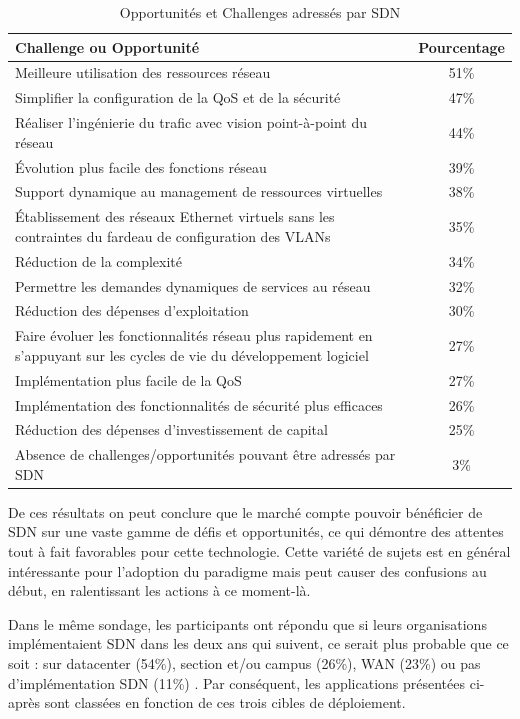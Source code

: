\begin{table}[!h]
\centering
\begin{tabular}{|p{12cm}|c|}
\hline 
\bf Challenge ou Opportunité & \bf Pourcentage \\ 
\hline 
Meilleure utilisation des ressources réseau & 51\% \\ 
\hline 
Simplifier la configuration de la QoS et de la sécurité  & 47\%  \\
\hline 
Réaliser l'ingénierie du trafic avec vision point-à-point du réseau & 44\% \\ 
\hline 
Évolution plus facile des fonctions réseau & 39\% \\ 
\hline 
Support dynamique au management de ressources virtuelles  & 38\% \\ 
\hline 
Établissement des réseaux Ethernet virtuels sans les contraintes du fardeau de configuration des VLANs & 35\% \\ 
\hline 
Réduction de la complexité & 34\% \\ 
\hline 
Permettre les demandes dynamiques de services au réseau & 32\% \\ 
\hline 
Réduction des dépenses d'exploitation & 30\% \\ 
\hline 
Faire évoluer les fonctionnalités réseau plus rapidement en s'appuyant sur les cycles de vie du développement logiciel & 27\% \\ 
\hline 
Implémentation plus facile de la QoS & 27\% \\ 
\hline 
Implémentation des fonctionnalités de sécurité plus efficaces & 26\% \\ 
\hline 
Réduction des dépenses d'investissement de capital & 25\% \\ 
\hline 
Absence de challenges/opportunités pouvant être adressés par SDN & 3\% \\ 
\hline 
\end{tabular}
\caption{Opportunités et Challenges adressés par SDN \cite{2013GuideSDNNVTable11}}
\end{table} 

\clearpage

De ces résultats on peut conclure que le marché compte pouvoir bénéficier de SDN sur une vaste gamme de défis et opportunités, ce qui démontre des attentes tout à fait favorables pour cette technologie. Cette variété de sujets est en général intéressante pour l'adoption du \gls{paradigme} mais peut causer des confusions au début, en ralentissant les actions à ce moment-là.

Dans le même sondage, les participants ont répondu que si leurs organisations implémentaient SDN dans les deux ans qui suivent, ce serait plus probable que ce soit : sur \gls{datacenter} (54\%), section et/ou campus (26\%), WAN (23\%) ou pas d'implémentation SDN (11\%) \cite{2013GuideSDNNVTable12}. Par conséquent, les applications présentées ci-après sont classées en fonction de ces trois cibles de déploiement.




